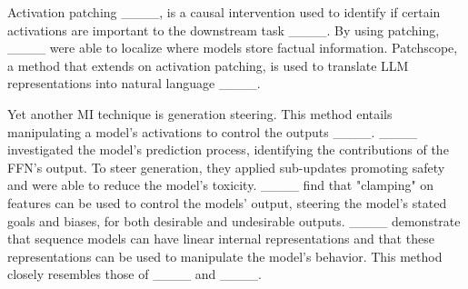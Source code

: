 Activation patching ____, is a causal intervention used to identify if certain activations are important to the downstream task ____. By using patching, ____ were able to localize where models store factual information.
Patchscope, a method that extends on activation patching, is used to translate LLM representations into natural language ____. 


Yet another MI technique is generation steering. This method entails manipulating a model's activations to control the outputs ____. ____ investigated the model's prediction process, identifying the contributions of the FFN's output. To steer generation, they applied sub-updates promoting safety and were able to reduce the model's toxicity. 
____ find that "clamping" on features can be used to control the models' output, steering the model's stated goals and biases, for both desirable and undesirable outputs. 
____ demonstrate that sequence models can have linear internal representations and that these representations can be used to manipulate the model's behavior. This method closely resembles those of ____ and ____.



